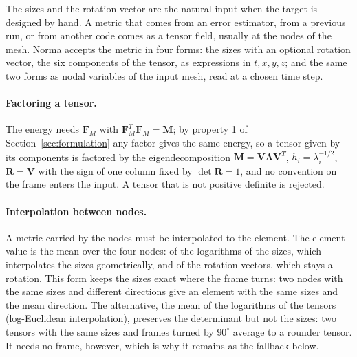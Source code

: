\documentclass[11pt]{article}
\newcommand{\bs}[1]{\boldsymbol{#1}}
\begin{document}
The sizes and the rotation vector are the natural input when the target
is designed by hand. A metric that comes from an error estimator, from a
previous run, or from another code comes as a tensor field, usually at
the nodes of the mesh. Norma accepts the metric in four forms: the sizes
with an optional rotation vector, the six components of the tensor, as
expressions in $t, x, y, z$; and the same two forms as nodal variables of
the input mesh, read at a chosen time step.

\paragraph{Factoring a tensor.} The energy needs $\bs F_M$ with
$\bs F_M^T \bs F_M = \bs M$; by property 1 of Section~\ref{sec:formulation}
any factor gives the same energy, so a tensor given by its components is
factored by the eigendecomposition $\bs M = \bs V \bs \Lambda \bs V^T$,
$h_i = \lambda_i^{-1/2}$, $\bs R = \bs V$ with the sign of one column
fixed by $\det \bs R = 1$, and no convention on the frame enters the
input. A tensor that is not positive definite is rejected.

\paragraph{Interpolation between nodes.} A metric carried by the nodes
must be interpolated to the element. The element value is the mean over
the four nodes: of the logarithms of the sizes, which interpolates the
sizes geometrically, and of the rotation vectors, which stays a rotation.
This form keeps the sizes exact where the frame turns: two nodes with the
same sizes and different directions give an element with the same sizes
and the mean direction. The alternative, the mean of the logarithms of
the tensors (log-Euclidean interpolation), preserves the determinant but
not the sizes: two tensors with the same sizes and frames turned by
$90^\circ$ average to a rounder tensor. It needs no frame, however, which
is why it remains as the fallback below.
\end{document}
